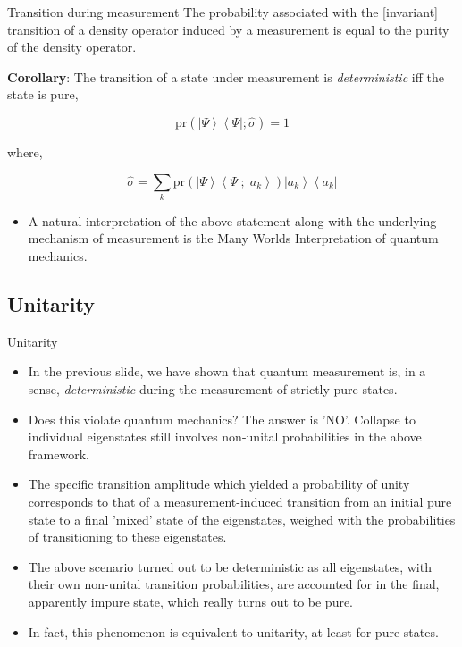 \documentclass[9pt,handout]{beamer}
\newcommand{\pr}[0]{\text{pr}}
\begin{document}
\begin{frame}{}
\begin{block}{Transition during measurement}
The probability associated with the [invariant] transition of a density operator induced by a measurement is equal to the purity of the density operator.

\textbf{Corollary}: The transition of a state under measurement is \emph{deterministic} iff the state is pure,

$$\pr \left( \left\lvert \Psi \right\rangle \left\langle \Psi \right\rvert; \widehat{\sigma} \right) = 1$$

where,

$$\widehat{\sigma} = \sum_k \pr \left( \left\lvert \Psi \right\rangle \left\langle \Psi \right\rvert; \left\lvert a_k \right\rangle \right) \left\lvert a_k \right\rangle \left\langle a_k \right\rvert$$
\end{block}

\begin{itemize}
\item A natural interpretation of the above statement along with the underlying mechanism of measurement is the Many Worlds Interpretation of quantum mechanics.
\end{itemize}
\end{frame}

\subsection{Unitarity}
\begin{frame}{Unitarity}
\begin{itemize}
\item In the previous slide, we have shown that quantum measurement is, in a sense, \emph{deterministic} during the measurement of strictly pure states.

\item Does this violate quantum mechanics? The answer is 'NO'. 
Collapse to individual eigenstates still involves non-unital probabilities in the above framework.

\item The specific transition amplitude which yielded a probability of unity corresponds to that of a measurement-induced transition from an initial pure state to a final 'mixed' state of the eigenstates, weighed with the probabilities of transitioning to these eigenstates.

\item The above scenario turned out to be deterministic as all eigenstates, with their own non-unital transition probabilities, are accounted for in the final, apparently impure state, which really turns out to be pure.

\item In fact, this phenomenon is equivalent to unitarity, at least for pure states.
\end{itemize}
\end{frame}
\end{document}
